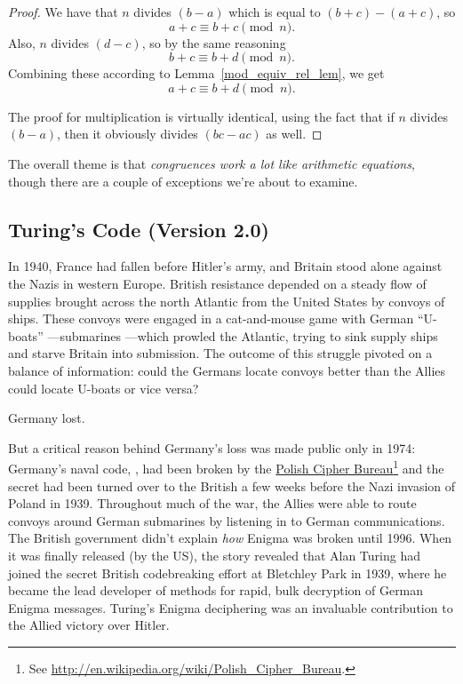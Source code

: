 \begin{proof}
We have that $n$ divides $(b-a)$ which is equal to $(b+c)-(a+c)$, so
\[
a+c \equiv b+c \pmod{n}.
\]
Also, $n$ divides $(d-c)$, so by the same reasoning
\[
b + c \equiv b + d \pmod{n}.
\]
Combining these according to Lemma~\ref{mod_equiv_rel_lem}, we get
\[
a + c \equiv b + d \pmod{n}.
\]
 
The proof for multiplication is virtually identical, using the fact
that if $n$ divides $(b-a)$, then it obviously divides $(bc-ac)$ as
well.
\end{proof}

The overall theme is that \emph{congruences work a lot like arithmetic
  equations}, though there are a couple of exceptions we're about to
examine.

\subsection{Turing's Code (Version 2.0)}

In 1940, France had fallen before Hitler's army, and Britain stood
alone against the Nazis in western Europe.  British resistance
depended on a steady flow of supplies brought across the north
Atlantic from the United States by convoys of ships.  These convoys
were engaged in a cat-and-mouse game with German ``U-boats''
---submarines ---which prowled the Atlantic, trying to sink supply
ships and starve Britain into submission.  The outcome of this
struggle pivoted on a balance of information: could the Germans locate
convoys better than the Allies could locate U-boats or vice versa?

Germany lost.

But a critical reason behind Germany's loss was made public only in
1974: Germany's naval code, , had been broken by the
\href{http://en.wikipedia.org/wiki/Polish_Cipher_Bureau}{Polish Cipher
  Bureau}\footnote{See
  \url{http://en.wikipedia.org/wiki/Polish\_Cipher\_Bureau}.} and the
secret had been turned over to the British a few weeks before the Nazi
invasion of Poland in 1939.  Throughout much of the war, the Allies
were able to route convoys around German submarines by listening in to
German communications.  The British government didn't explain
\emph{how} Enigma was broken until 1996.  When it was finally released
(by the US), the story revealed that Alan Turing had joined the secret
British codebreaking effort at Bletchley Park in 1939, where he became
the lead developer of methods for rapid, bulk decryption of German
Enigma messages.  Turing's Enigma deciphering was an invaluable
contribution to the Allied victory over Hitler.

